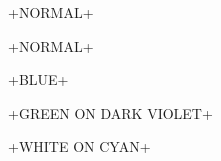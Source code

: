 \documentclass{article}
\begin{document}
\myverb+NORMAL+

\myverb+NORMAL+

\myverb[blue]+BLUE+

\myverb[green][DarkViolet]+GREEN ON DARK VIOLET+ 

\myverb[white][cyan]+WHITE ON CYAN+    
\end{document}
